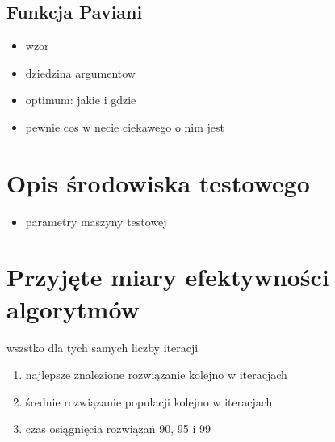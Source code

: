 \subsection{Funkcja Paviani}
\begin{itemize}
\item wzor
\item dziedzina argumentow
\item optimum: jakie i gdzie
\item pewnie cos w necie ciekawego o nim jest
\end{itemize}

\section{Opis środowiska testowego}
\begin{itemize}
\item parametry maszyny testowej

\end{itemize}


\section{Przyjęte miary efektywności algorytmów}
\label{sec:przyjete_miary_efektywnosci_algorytmow}
wszstko dla tych samych liczby iteracji
\begin{enumerate}
\item najlepsze znalezione rozwiązanie kolejno w iteracjach
\item średnie rozwiązanie populacji kolejno w iteracjach
\item czas osiągnięcia rozwiązań 90, 95 i 99%

\end{enumerate}
